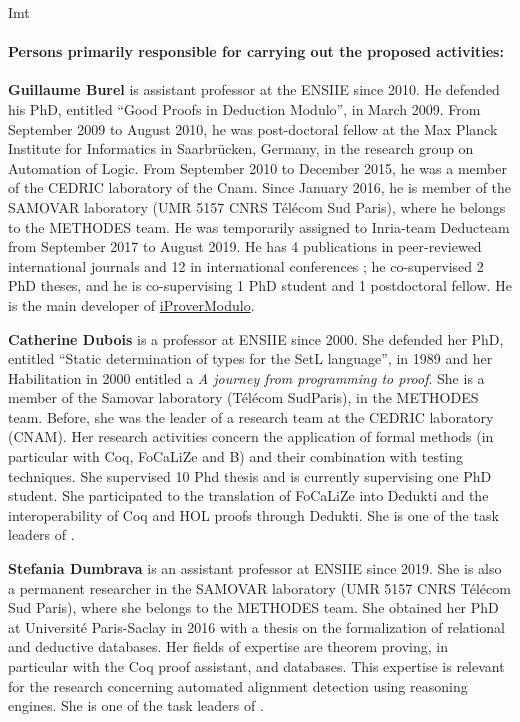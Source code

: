 \begin{sitedescription}{Imt}
\paragraph*{Persons primarily responsible for carrying out the proposed activities:}

\begin{compactitem} %

\item{\bf Guillaume Burel}
 is
assistant professor at the ENSIIE since 2010. He defended his PhD,
entitled ``Good Proofs in Deduction Modulo'', in March 2009. From
September 2009 to August 2010, he was post-doctoral fellow at the Max
Planck Institute for Informatics in Saarbr\"ucken, Germany, in the
research group on Automation of Logic. From September 2010 to December
2015, he was a member of the CEDRIC laboratory of the Cnam. Since
January 2016, he is member of the SAMOVAR laboratory (UMR 5157 CNRS
T\'el\'ecom Sud Paris), where he belongs to the METHODES team. He was
temporarily assigned to Inria-team Deducteam from September 2017 to
August 2019.  He has 4
publications in peer-reviewed international journals and 12 in
international conferences ; he co-supervised 2 PhD theses, and he is
co-supervising 1 PhD student and 1 postdoctoral fellow. He is the
main developer of
\href{http://www.ensiie.fr/~guillaume.burel/blackandwhite_iProverModulo.html.en}{iProverModulo}.

\item {\bf Catherine Dubois} is a professor at ENSIIE since 2000. She defended her PhD, entitled ``Static determination of types for the SetL language'', in 1989 and her Habilitation in 2000 entitled a
\emph{A journey from programming to proof}. She is a
member of the Samovar laboratory (T\'el\'ecom
SudParis), in the METHODES team. Before, she was the leader of a research team at the CEDRIC laboratory (CNAM). Her research activities concern the application of formal methods (in particular with Coq, FoCaLiZe and B) and their combination with testing techniques. She supervised 10 Phd thesis and is currently supervising one PhD student. She participated to the translation of FoCaLiZe into Dedukti and the interoperability of Coq and HOL proofs through Dedukti.
She is one of the task leaders of .

\item{\bf Stefania Dumbrava}
is an assistant professor at ENSIIE since 2019. She is also a permanent researcher in the SAMOVAR laboratory (UMR 5157 CNRS T\'el\'ecom
Sud Paris), where she belongs to the METHODES team. She obtained her PhD at Universit\'e Paris-Saclay in 2016 with a thesis on the formalization
of relational and deductive databases. Her fields of expertise are theorem proving, in particular with the Coq proof assistant, and databases.
This expertise is relevant for the research concerning automated alignment detection using reasoning engines. She is one of the task leaders of .
\end{compactitem}


\end{sitedescription}
